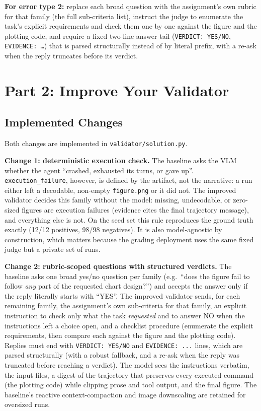\documentclass[11pt]{article}
\begin{document}
\textbf{For error type 2:} replace each broad question with the assignment's
own rubric for that family (the full sub-criteria list), instruct the judge
to enumerate the task's explicit requirements and check them one by one
against the figure and the plotting code, and require a fixed two-line
answer tail (\texttt{VERDICT: YES/NO}, \texttt{EVIDENCE: \ldots}) that is
parsed structurally instead of by literal prefix, with a re-ask when the
reply truncates before its verdict.

\section{Part 2: Improve Your Validator}

\subsection{Implemented Changes}
Both changes are implemented in \texttt{validator/solution.py}.

\textbf{Change 1: deterministic execution check.} The baseline asks the VLM
whether the agent ``crashed, exhausted its turns, or gave up''.
\texttt{execution\_failure}, however, is defined by the artifact, not the
narrative: a run either left a decodable, non-empty \texttt{figure.png} or it
did not. The improved validator decides this family without the model: missing,
undecodable, or zero-sized figures are execution failures (evidence cites the
final trajectory message), and everything else is not. On the seed set this
rule reproduces the ground truth exactly (12/12 positives, 98/98 negatives).
It is also model-agnostic by construction, which matters because the grading
deployment uses the same fixed judge but a private set of runs.

\textbf{Change 2: rubric-scoped questions with structured verdicts.} The
baseline asks one broad yes/no question per family (e.g.\ ``does the figure
fail to follow \emph{any} part of the requested chart design?'') and accepts
the answer only if the reply literally starts with ``YES''. The improved
validator sends, for each remaining family, the assignment's own sub-criteria
for that family, an explicit instruction to check only what the task
\emph{requested} and to answer NO when the instructions left a choice open,
and a checklist procedure (enumerate the explicit requirements, then compare
each against the figure and the plotting code). Replies must end with
\texttt{VERDICT: YES/NO} and \texttt{EVIDENCE: ...} lines, which are parsed
structurally (with a robust fallback, and a re-ask when the reply was
truncated before reaching a verdict). The model sees the instructions
verbatim, the input files, a digest of the trajectory that preserves every
executed command (the plotting code) while clipping prose and tool output,
and the final figure. The baseline's reactive context-compaction and image
downscaling are retained for oversized runs.
\end{document}
